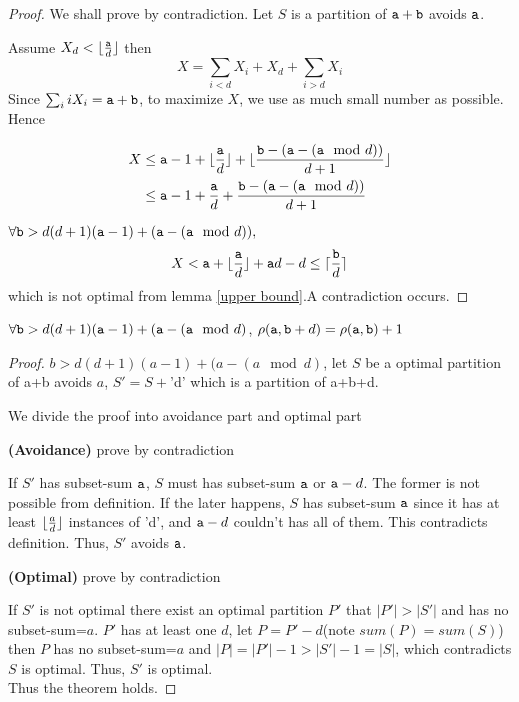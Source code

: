 \begin{proof} 
  We shall prove by contradiction.
  Let $S$ is a partition of $\mathtt{a}+\mathtt{b}$ avoids $\mathtt{a}$.

  Assume $X_d<\lfloor{\frac{\mathtt{a}}{d}} \rfloor $ then 
  \[
  X=\sum_{i<d}{X_i}+X_d+\sum_{i>d}{X_i}
  \]
  Since $\sum_i{iX_i}=\mathtt{a}+\mathtt{b}$, to maximize $X$, we use as much small number as possible. Hence

  \begin{align*}
  X&\leq \mathtt{a}-1+ \lfloor\frac{\mathtt{a}}{d}\rfloor   +\lfloor{\frac{\mathtt{b}-(\mathtt{a}- (\mathtt{a}\mod d))}{d+1}}\rfloor\\
   &\leq \mathtt{a}-1+ \frac{\mathtt{a}}{d}   +{\frac{\mathtt{b}-(\mathtt{a} - (\mathtt{a}\mod d))}{d+1}}
  \end{align*}
  
  $\forall \mathtt{b}>d(d+1)(\mathtt{a}-1) + (\mathtt{a} - (\mathtt{a}\mod d)), $
  \[X<\mathtt{a}+\lfloor\frac{\mathtt{a}}{d}\rfloor + \mathtt{a} d -d \leq \lceil\frac{\mathtt{b}}{d}\rceil
  \]
  which is not optimal from lemma \ref{upper bound}.A contradiction occurs.
\end{proof}

\begin{theorem}
	$\forall \mathtt{b}>d(d+1)(\mathtt{a}-1)  + (\mathtt{a} - (\mathtt{a}\mod d)$, $\rho(\mathtt{a},\mathtt{b}+d)=\rho(\mathtt{a},\mathtt{b})+1$
\end{theorem}

\begin{proof}
    $b>d(d+1)(a-1)  + (a - (a\mod d)$,
    let $S$ be a optimal partition of a+b avoids $a$, $S'=S+$'d' which is a partition of a+b+d.

    We divide the proof into avoidance part and optimal part

    {\bf(Avoidance)}
    prove by contradiction

    If $S'$ has subset-sum $\mathtt{a}$, $S$ must has subset-sum $\mathtt{a}$ or $\mathtt{a}-d$. The former is not possible from definition. 
    If the later happens, $S$ has subset-sum $\mathtt{a}$ since it has at least $\lfloor{\frac{a}{d}}\rfloor$ instances of 'd', and $\mathtt{a}-d$ couldn't has all of them. This contradicts definition.
    Thus, $S'$ avoids $\mathtt{a}$.

    {\bf(Optimal)}
        prove by contradiction

        If $S'$ is not optimal there exist an optimal partition $P'$ that $|P'|>|S'|$ and has no subset-sum=$a$. $P'$ has at least one $d$, let $P=P'-d$(note $sum(P)=sum(S)$) then $P$ has no subset-sum=$a$ and $|P|=|P'|-1>|S'|-1=|S|$, which contradicts $S$ is optimal. Thus, $S'$ is optimal.
\\
    Thus the theorem holds.
\end{proof}

